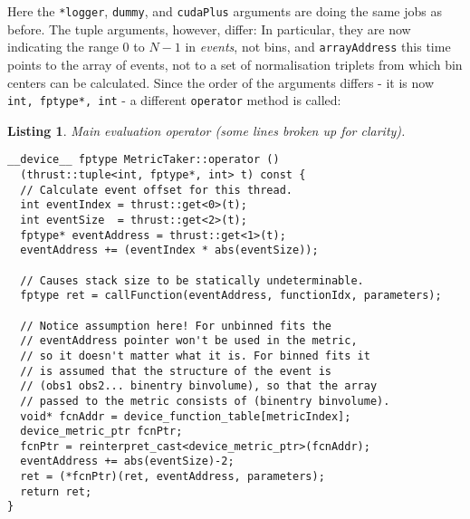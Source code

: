 \documentclass[12pt,pdflatex]{article}
\newtheorem{listing}{Listing}
\begin{document}
Here the \verb|*logger|, \verb|dummy|, and \verb|cudaPlus| arguments are doing
the same jobs as before. The tuple arguments, however, differ: In particular,
they are now indicating the range 0 to $N-1$ in \emph{events}, not bins, and
\verb|arrayAddress| this time points to the array of events, not to a set of 
normalisation triplets from which bin centers can be calculated. Since the order
of the arguments differs - it is now \verb|int, fptype*, int| - a different 
\texttt{operator} method is called: 
\begin{listing}
\label{listing:maineval} 
Main evaluation operator (some lines broken up for clarity). 

\begin{verbatim}
__device__ fptype MetricTaker::operator () 
  (thrust::tuple<int, fptype*, int> t) const {
  // Calculate event offset for this thread. 
  int eventIndex = thrust::get<0>(t);
  int eventSize  = thrust::get<2>(t);
  fptype* eventAddress = thrust::get<1>(t);
  eventAddress += (eventIndex * abs(eventSize)); 

  // Causes stack size to be statically undeterminable.
  fptype ret = callFunction(eventAddress, functionIdx, parameters);

  // Notice assumption here! For unbinned fits the 
  // eventAddress pointer won't be used in the metric, 
  // so it doesn't matter what it is. For binned fits it 
  // is assumed that the structure of the event is 
  // (obs1 obs2... binentry binvolume), so that the array
  // passed to the metric consists of (binentry binvolume). 
  void* fcnAddr = device_function_table[metricIndex];
  device_metric_ptr fcnPtr;
  fcnPtr = reinterpret_cast<device_metric_ptr>(fcnAddr);
  eventAddress += abs(eventSize)-2;
  ret = (*fcnPtr)(ret, eventAddress, parameters);
  return ret; 
}
\end{verbatim}
\end{listing}
\end{document}
